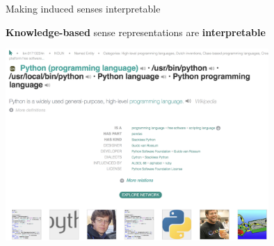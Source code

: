 \documentclass[usenames,dvipsnames]{beamer}
\begin{document}
\begin{frame}{ Making induced senses interpretable }

\vspace{-1em}

\textbf{Knowledge-based} sense representations are \alert{\textbf{interpretable}}
	\begin{center}
	\includegraphics[width=0.75\textwidth]{babelnet}
	\end{center}


\end{frame}
\end{document}
